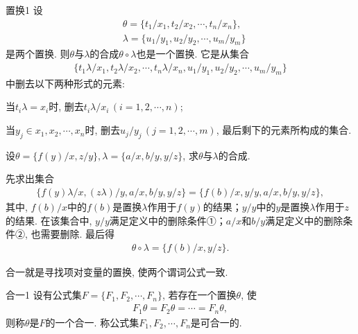 \begin{mydef}{置换}{1}
设
\begin{align}
    &\theta =\{t_1/x_1,t_2/x_2,\cdots,t_n/x_n\},\\
    &\lambda =\{u_1/y_1, u_2/y_2, \cdots , u_m/y_m \}
\end{align}
是两个置换. 则$\theta$与$\lambda$的合成$\theta \circ \lambda$也是一个置换. 它是从集合
\begin{align}
  \{ t_1\lambda /x_1, t_2\lambda /x_2, \cdots , t_n\lambda /x_n,  u_1/y_1, u_2/y_2, \cdots , u_m/y_m \}
\end{align}
中删去以下两种形式的元素:

        当$t_i\lambda =x_i$时, 删去$t_i\lambda /x_i\, (i=1, 2 ,\cdots, n)$;

        当$y_j\in { x_1, x_2 ,\cdots, x_n }时$, 删去$u_j/y_j\, (j=1, 2 ,\cdots, m)$, 最后剩下的元素所构成的集合.
\end{mydef}
\begin{example}
    设$\theta =\{ f(y)/x, z/y \}, \lambda =\{a/x, b/y ,y/z \}$, 求$\theta $与$\lambda $的合成.
\end{example}
\begin{result}
    先求出集合
\begin{align}
  \{f(y)\lambda/x, (z\lambda)/y, a/x, b/y , y/z\}=\{f(b)/x, y/y, a/x, b/y , y/z\},
\end{align}
其中, $f(b)/x$中的$f(b)$是置换$\lambda$作用于$f(y)$的结果；$y/y$中的$y$是置换$\lambda$作用于$z$的结果. 在该集合中, $y/y$满足定义中的删除条件①；$a/x$和$b/y$满足定义中的删除条件②, 也需要删除. 最后得
\begin{align}
  \theta \circ \lambda =\{f(b)/x, y/z\}.
\end{align}
\end{result}
\begin{remark}
    合一就是寻找项对变量的置换, 使两个谓词公式一致.
\end{remark}

\begin{mydef}{合一}{1}
设有公式集$F=\{F_1, F_2,\cdots,F_n\}$, 若存在一个置换$\theta$, 使
\begin{align}
  F_1\theta =F_2\theta =\cdots=F_n\theta ,
\end{align}
则称$\theta$是$F$的一个合一. 称公式集$F_1,F_2,\cdots,F_n$是可合一的.
\end{mydef}

